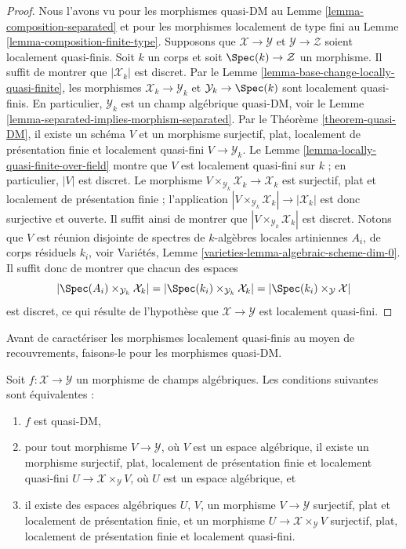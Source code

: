\begin{proof}
Nous l'avons vu pour les morphismes quasi-DM au
Lemme \ref{lemma-composition-separated} et pour les morphismes localement de
type fini au Lemme \ref{lemma-composition-finite-type}.
Supposons que $\mathcal{X} \to \mathcal{Y}$ et
$\mathcal{Y} \to \mathcal{Z}$ soient localement quasi-finis. Soit $k$ un
corps et soit $\Spec(k) \to \mathcal{Z}$ un morphisme.
Il suffit de montrer que $|\mathcal{X}_k|$ est discret. Par le
Lemme \ref{lemma-base-change-locally-quasi-finite}, les morphismes
$\mathcal{X}_k \to \mathcal{Y}_k$ et
$\mathcal{Y}_k \to \Spec(k)$ sont localement quasi-finis.
En particulier, $\mathcal{Y}_k$ est un champ algébrique quasi-DM, voir le
Lemme \ref{lemma-separated-implies-morphism-separated}.
Par le Théorème \ref{theorem-quasi-DM}, il existe un schéma $V$ et un
morphisme surjectif, plat, localement de présentation finie et localement
quasi-fini $V \to \mathcal{Y}_k$. Le
Lemme \ref{lemma-locally-quasi-finite-over-field} montre que $V$ est
localement quasi-fini sur $k$ ; en particulier, $|V|$ est discret. Le morphisme
$V \times_{\mathcal{Y}_k} \mathcal{X}_k \to \mathcal{X}_k$ est surjectif,
plat et localement de présentation finie ; l'application
$|V \times_{\mathcal{Y}_k} \mathcal{X}_k| \to |\mathcal{X}_k|$ est donc
surjective et ouverte. Il suffit ainsi de montrer que
$|V \times_{\mathcal{Y}_k} \mathcal{X}_k|$ est discret.
Notons que $V$ est réunion disjointe de spectres de $k$-algèbres locales
artiniennes $A_i$, de corps résiduels $k_i$, voir Variétés,
Lemme \ref{varieties-lemma-algebraic-scheme-dim-0}.
Il suffit donc de montrer que chacun des espaces
$$
|\Spec(A_i) \times_{\mathcal{Y}_k} \mathcal{X}_k| =
|\Spec(k_i) \times_{\mathcal{Y}_k} \mathcal{X}_k| =
|\Spec(k_i) \times_\mathcal{Y} \mathcal{X}|
$$
est discret, ce qui résulte de l'hypothèse que
$\mathcal{X} \to \mathcal{Y}$ est localement quasi-fini.
\end{proof}

\noindent
Avant de caractériser les morphismes localement quasi-finis au moyen de
recouvrements, faisons-le pour les morphismes quasi-DM.

\begin{lemma}
\label{lemma-characterize-quasi-DM}
Soit $f : \mathcal{X} \to \mathcal{Y}$ un morphisme de champs algébriques.
Les conditions suivantes sont équivalentes :
\begin{enumerate}
\item $f$ est quasi-DM,
\item pour tout morphisme $V \to \mathcal{Y}$, où $V$ est un espace
algébrique, il existe un morphisme surjectif, plat, localement de présentation
finie et localement quasi-fini
$U \to \mathcal{X} \times_\mathcal{Y} V$, où $U$ est un espace algébrique,
et
\item il existe des espaces algébriques $U$, $V$, un morphisme
$V \to \mathcal{Y}$ surjectif, plat et localement de présentation finie,
et un morphisme $U \to \mathcal{X} \times_\mathcal{Y} V$ surjectif, plat,
localement de présentation finie et localement quasi-fini.
\end{enumerate}
\end{lemma}

